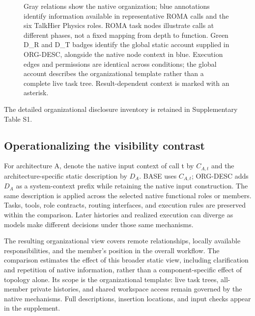 \documentclass[10pt,letterpaper,twocolumn]{article}
\newcommand{\Description}[1]{} %
\begin{document}
\begin{figure}[t]
\caption{Gray relations show the na\-tive or\-ga\-ni\-za\-tion; blue annotations identify in\-for\-ma\-tion available in representative ROMA calls and the six TalkHier Phys\-ics roles. ROMA task nodes illustrate calls at dif\-fer\-ent phases, not a fixed mapping from depth to function. Green D\_R and D\_T badges identify the global stat\-ic account supplied in ORG-\allowbreak{}DESC, alongside the na\-tive node con\-text in blue. Execution edges and permissions are identical across conditions; the global account describes the or\-ga\-ni\-za\-tion\-al template rather than a complete live task tree. Result-dependent con\-text is marked with an asterisk.}
\label{fig:views}
\Description{Side-by-side node-annotated diagrams of recursive ROMA tasks and the fixed six-role TalkHier Physics hierarchy. Gray marks native routes, blue native input context, and green the static organizational account.}
\end{figure}
The detailed or\-ga\-ni\-za\-tion\-al disclosure inventory is retained in Supplementary Table S1.

\subsection{Operationalizing the vis\-i\-bil\-i\-ty con\-trast}
For ar\-chi\-tec\-ture A, denote the na\-tive input con\-text of call t by $C_{A,t}$ and the ar\-chi\-tec\-ture-specific stat\-ic de\-scrip\-tion by $D_A$. BASE uses $C_{A,t}$; ORG-\allowbreak{}DESC adds $D_A$ as a sys\-tem-con\-text prefix while retaining the na\-tive input construction. The same de\-scrip\-tion is applied across the selected na\-tive functional roles or members. Tasks, tools, role contracts, routing in\-ter\-faces, and ex\-e\-cu\-tion rules are preserved within the comparison. Later histories and realized ex\-e\-cu\-tion can diverge as mod\-els make dif\-fer\-ent decisions under those same mech\-a\-nisms.

The resulting or\-ga\-ni\-za\-tion\-al view covers remote relationships, locally available responsibilities, and the member's position in the overall workflow. The comparison es\-ti\-mates the effect of this broad\-er stat\-ic view, including clarification and repetition of na\-tive in\-for\-ma\-tion, rather than a component-specific effect of topo\-lo\-gy alone. Its scope is the or\-ga\-ni\-za\-tion\-al template: live task trees, all-member private histories, and shared workspace access remain governed by the na\-tive mech\-a\-nisms. Full de\-scrip\-tions, insertion locations, and input checks appear in the supplement.
\end{document}
